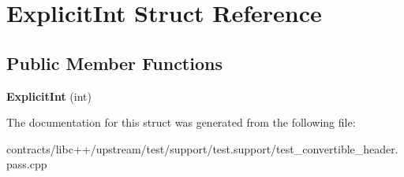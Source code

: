 \hypertarget{struct_explicit_int}{}\section{Explicit\+Int Struct Reference}
\label{struct_explicit_int}
\subsection*{Public Member Functions}
\begin{DoxyCompactItemize}
\item 
\mbox{\label{struct_explicit_int_a7bd6c1a9ffdcbddbeabe4475b6fa613c}} 
{\bfseries Explicit\+Int} (int)
\end{DoxyCompactItemize}


The documentation for this struct was generated from the following file\+:\begin{DoxyCompactItemize}
\item 
contracts/libc++/upstream/test/support/test.\+support/test\+\_\+convertible\+\_\+header.\+pass.\+cpp\end{DoxyCompactItemize}

